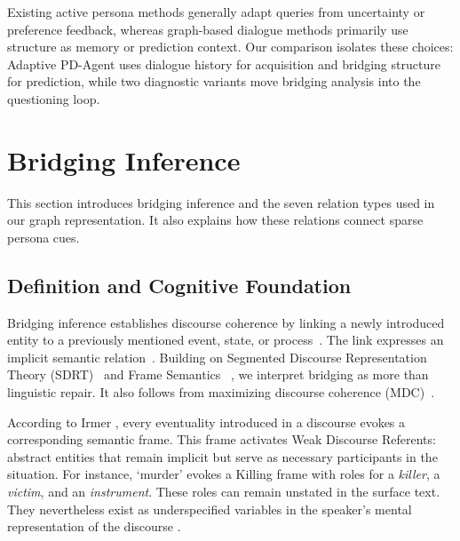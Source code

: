 \documentclass{ieeeaccess}
\begin{document}
Existing active persona methods generally adapt queries from uncertainty or preference
feedback, whereas graph-based dialogue methods primarily use structure as memory or
prediction context. Our comparison isolates these choices: Adaptive PD-Agent uses dialogue
history for acquisition and bridging structure for prediction, while two diagnostic variants
move bridging analysis into the questioning loop.

\section{Bridging Inference}

This section introduces bridging inference and the seven relation types used in our graph
representation. It also explains how these relations connect sparse persona cues.

\subsection{Definition and Cognitive Foundation}
Bridging inference establishes discourse coherence by linking a newly introduced entity
to a previously mentioned event, state, or process~\cite{asher2003logics,murphy1985processes,
huang2000discourse}. The link expresses an implicit semantic relation~\cite{clark1977comprehension,
irmer2011bridging,asher1998semantics,baker1998berkeley,bos1995bridging}. Building on Segmented
Discourse Representation Theory (SDRT)~\cite{asher2003logics} and Frame Semantics
~\cite{fillmore1976frame,malt1985role}, we interpret bridging as more than linguistic repair.
It also follows from maximizing discourse coherence (MDC)~\cite{chierchia2009dynamics,
johnson1977thinking,cohen2007anaphora}.

According to Irmer \cite{irmer2011bridging,fillmore2003background}, every eventuality
introduced in a discourse evokes a corresponding semantic frame. This frame activates
Weak Discourse Referents: abstract entities that remain implicit but serve as necessary
participants in the situation. For instance, `murder' evokes a Killing frame with roles
for a \textit{killer}, a \textit{victim}, and an \textit{instrument}. These roles can remain
unstated in the surface text. They nevertheless exist as underspecified variables in the
speaker's mental representation of the discourse
\cite{farkas2003semantics,kamp2013discourse,koenig1999definites}.
\end{document}

